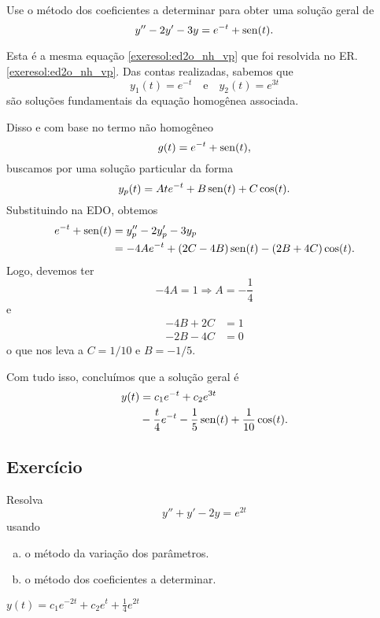 \begin{exeresol}
  Use o método dos coeficientes a determinar para obter uma solução geral de
  \begin{equation}
    y'' - 2y' - 3y = e^{-t}+\operatorname{sen}(t).
  \end{equation}  
\end{exeresol}
\begin{resol}
  Esta é a mesma equação \eqref{exeresol:ed2o_nh_vp} que foi resolvida no ER. \ref{exeresol:ed2o_nh_vp}. Das contas realizadas, sabemos que
  \begin{equation}
    y_1(t) = e^{-t}\quad\text{e}\quad y_2(t) = e^{3t}
  \end{equation}
  são soluções fundamentais da equação homogênea associada.

  Disso e com base no termo não homogêneo
  \begin{equation}
    g(t) = e^{-t} + \operatorname{sen}(t),
  \end{equation}
  buscamos por uma solução particular da forma
  \begin{equation}
    y_p(t) = Ate^{-t} + B\operatorname{sen}(t) + C\cos(t).
  \end{equation}
  Substituindo na EDO, obtemos
  \begin{align}
    e^{-t} + \operatorname{sen}(t) &= y_p'' - 2y_p' - 3y_p \\
                     &= -4Ae^{-t}+(2C-4B)\operatorname{sen}(t)-(2B+4C)\cos(t).
  \end{align}
  Logo, devemos ter
  \begin{equation}
    -4A = 1 \Rightarrow A = -\frac{1}{4}
  \end{equation}
  e
  \begin{align}
    -4B+2C &= 1 \\
    -2B-4C &= 0
  \end{align}
  o que nos leva a $C = 1/10$ e $B = -1/5$.

  Com tudo isso, concluímos que a solução geral é
  \begin{align}
    y(t) &= c_1e^{-t} + c_2e^{3t} \\
         &- \frac{t}{4}e^{-t} - \frac{1}{5}\operatorname{sen}(t) + \frac{1}{10}\cos(t).    
  \end{align}
\end{resol}

\subsection*{Exercício}

\begin{exer}
  Resolva
  \begin{equation}
    y'' + y' - 2y = e^{2t}
  \end{equation}
  usando
  \begin{enumerate}[a)]
  \item o método da variação dos parâmetros.
  \item o método dos coeficientes a determinar.
  \end{enumerate}
\end{exer}
\begin{resp}
  $y(t) = c_1e^{-2t} + c_2e^t + \frac{1}{4}e^{2t}$
\end{resp}

